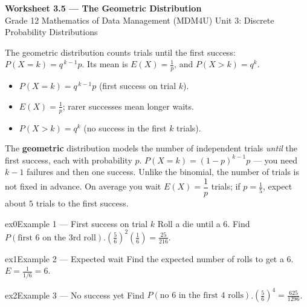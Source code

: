 \documentclass[11pt]{article}
\begin{document}
\begin{center}
{\LARGE\bfseries\color{titleblue}Worksheet 3.5 --- The Geometric Distribution}\\[2pt]
{\small Grade 12 Mathematics of Data Management (MDM4U) \textperiodcentered{} Unit 3: Discrete Probability Distributions}
\end{center}

\begin{ideabox}
The geometric distribution counts trials until the first success: $P(X=k)=q^{\,k-1}p$. Its mean is $E(X)=\tfrac1p$, and $P(X>k)=q^{k}$.
\begin{itemize}[leftmargin=*,itemsep=2pt]
  \item $P(X=k)=q^{\,k-1}p$ (first success on trial $k$).
  \item $E(X)=\tfrac1p$; rarer successes mean longer waits.
  \item $P(X>k)=q^{k}$ (no success in the first $k$ trials).
\end{itemize}
\end{ideabox}

\begin{learnbox}
The \textbf{geometric} distribution models the number of independent trials \emph{until} the first success, each with probability $p$.
$P(X=k)=(1-p)^{k-1}p$ — you need $k-1$ failures and then one success. Unlike the binomial, the number of trials is not fixed in advance.
On average you wait $E(X)=\dfrac1p$ trials; if $p=\tfrac15$, expect about $5$ trials to the first success.
\end{learnbox}


\begin{example}{ex0}{Example 1 --- First success on trial $k$}
Roll a die until a 6. Find $P(\text{first 6 on the 3rd roll})$.\soln $\left(\tfrac56\right)^2\left(\tfrac16\right)=\tfrac{25}{216}$.
\end{example}

\begin{example}{ex1}{Example 2 --- Expected wait}
Find the expected number of rolls to get a 6.\soln $E=\tfrac{1}{1/6}=6$.
\end{example}

\begin{example}{ex2}{Example 3 --- No success yet}
Find $P(\text{no 6 in the first 4 rolls})$.\soln $\left(\tfrac56\right)^4=\tfrac{625}{1296}$.
\end{example}
\end{document}
